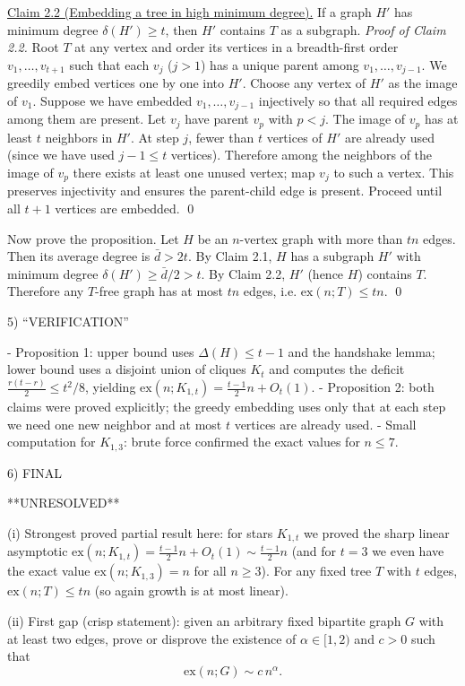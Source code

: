 \underline{Claim 2.2 (Embedding a tree in high minimum degree).}
If a graph $H'$ has minimum degree $\delta(H')\ge t$, then $H'$ contains $T$ as a subgraph.
\emph{Proof of Claim 2.2.}
Root $T$ at any vertex and order its vertices in a breadth-first order $v_1,\dots,v_{t+1}$ such that each $v_j$ ($j>1$) has a unique parent among $v_1,\dots,v_{j-1}$. We greedily embed vertices one by one into $H'$.
Choose any vertex of $H'$ as the image of $v_1$. Suppose we have embedded $v_1,\dots,v_{j-1}$ injectively so that all required edges among them are present. Let $v_j$ have parent $v_p$ with $p<j$. The image of $v_p$ has at least $t$ neighbors in $H'$.
At step $j$, fewer than $t$ vertices of $H'$ are already used (since we have used $j-1\le t$ vertices). Therefore among the neighbors of the image of $v_p$ there exists at least one unused vertex; map $v_j$ to such a vertex. This preserves injectivity and ensures the parent-child edge is present. Proceed until all $t+1$ vertices are embedded.
\qed

Now prove the proposition. Let $H$ be an $n$-vertex graph with more than $t n$ edges. Then its average degree is $\bar d>2t$. By Claim 2.1, $H$ has a subgraph $H'$ with minimum degree $\delta(H')\ge \bar d/2>t$. By Claim 2.2, $H'$ (hence $H$) contains $T$. Therefore any $T$-free graph has at most $t n$ edges, i.e. $\mathrm{ex}(n;T)\le t n$.
\qed

5) “VERIFICATION”

- Proposition 1: upper bound uses $\Delta(H)\le t-1$ and the handshake lemma; lower bound uses a disjoint union of cliques $K_t$ and computes the deficit $\frac{r(t-r)}{2}\le t^2/8$, yielding $\mathrm{ex}(n;K_{1,t})=\frac{t-1}{2}n+O_t(1)$. 
- Proposition 2: both claims were proved explicitly; the greedy embedding uses only that at each step we need one new neighbor and at most $t$ vertices are already used.
- Small computation for $K_{1,3}$: brute force confirmed the exact values for $n\le 7$.

6) FINAL

**UNRESOLVED**

(i) Strongest proved partial result here: for stars $K_{1,t}$ we proved the sharp linear asymptotic $\mathrm{ex}(n;K_{1,t})=\frac{t-1}{2}n+O_t(1)\sim \frac{t-1}{2}n$ (and for $t=3$ we even have the exact value $\mathrm{ex}(n;K_{1,3})=n$ for all $n\ge 3$). For any fixed tree $T$ with $t$ edges, $\mathrm{ex}(n;T)\le t n$ (so again growth is at most linear).

(ii) First gap (crisp statement): given an arbitrary fixed bipartite graph $G$ with at least two edges, prove or disprove the existence of $\alpha\in[1,2)$ and $c>0$ such that
\[
\mathrm{ex}(n;G) \sim c\,n^{\alpha}.
\]

